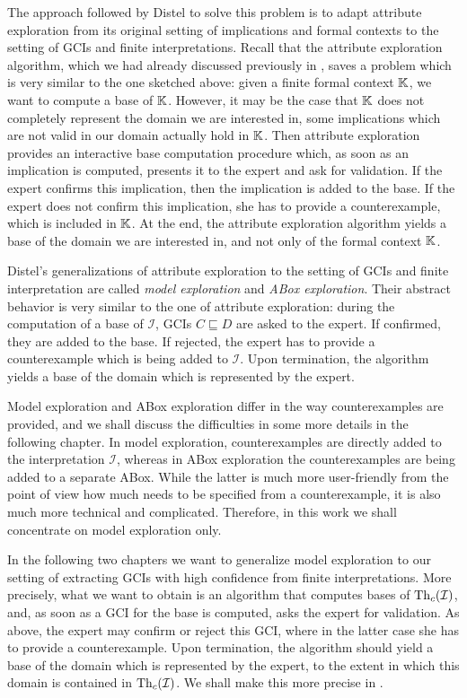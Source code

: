 The approach followed by Distel to solve this problem is to adapt attribute exploration
from its original setting of implications and formal contexts to the setting of GCIs and
finite interpretations.  Recall that the attribute exploration algorithm, which we had
already discussed previously in , saves a problem which is very
similar to the one sketched above: given a finite formal context ${\mathbb{K}}$, we want to
compute a base of ${\mathbb{K}}$.  However, it may be the case that ${\mathbb{K}}$ does not completely
represent the domain we are interested in, \ie some implications which are not valid in
our domain actually hold in ${\mathbb{K}}$.  Then attribute exploration provides an interactive
base computation procedure which, as soon as an implication is computed, presents it to
the expert and ask for validation.  If the expert confirms this implication, then the
implication is added to the base.  If the expert does not confirm this implication, she
has to provide a counterexample, which is included in ${\mathbb{K}}$.  At the end, the attribute
exploration algorithm yields a base of the domain we are interested in, and not only of
the formal context ${\mathbb{K}}$.

Distel's generalizations of attribute exploration to the setting of GCIs and finite
interpretation are called \emph{model exploration} and \emph{ABox exploration}.  Their
abstract behavior is very similar to the one of attribute exploration: during the
computation of a base of $\mathcal{I}$, GCIs $C \sqsubseteq D$ are asked to the expert.
If confirmed, they are added to the base.  If rejected, the expert has to provide a
counterexample which is being added to $\mathcal{I}$.  Upon termination, the algorithm
yields a base of the domain which is represented by the expert.

Model exploration and ABox exploration differ in the way counterexamples are provided, and
we shall discuss the difficulties in some more details in the following chapter.  In model
exploration, counterexamples are directly added to the interpretation $\mathcal{I}$,
whereas in ABox exploration the counterexamples are being added to a separate ABox.  While
the latter is much more user-friendly from the point of view how much needs to be
specified from a counterexample, it is also much more technical and complicated.
Therefore, in this work we shall concentrate on model exploration only.

In the following two chapters we want to generalize model exploration to our setting of
extracting GCIs with high confidence from finite interpretations.  More precisely, what we
want to obtain is an algorithm that computes bases of $\operatorname{Th}_c(\mathcal{I})$, and, as soon
as a GCI for the base is computed, asks the expert for validation.  As above, the expert
may confirm or reject this GCI, where in the latter case she has to provide a
counterexample.  Upon termination, the algorithm should yield a base of the domain which
is represented by the expert, to the extent in which this domain is contained in
$\operatorname{Th}_c(\mathcal{I})$.  We shall make this more precise in .

